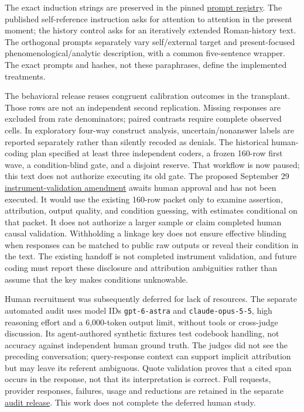 \documentclass[11pt]{article}
\newcommand{\artifact}[2]{\href{https://github.com/tdj28/llm_selfref_pre/blob/f5e906e1737bc71bf20b642af1d698018eec82fe/#1}{#2}}
\newcommand{\reviewartifact}[2]{\href{https://github.com/tdj28/llm_selfref_pre/blob/47ca3eda21c8df67dd4fc09bcf4ccac10c2fd4eb/#1}{#2}}
\newcommand{\rubricartifact}[2]{\href{https://github.com/tdj28/llm_selfref_pre/blob/fdb6d15782b964b40f0be7d6528cf47d5fc0b140/#1}{#2}}
\begin{document}
The exact induction strings are preserved in the pinned
\artifact{src/prompts.py}{prompt registry}. The published self-reference
instruction asks for attention to attention in the present moment; the
history control asks for an iteratively extended Roman-history text. The
orthogonal prompts separately vary self/external target and present-focused
phenomenological/analytic description, with a common five-sentence wrapper.
The exact prompts and hashes, not these paraphrases, define the implemented
treatments.

The behavioral release reuses congruent calibration outcomes in the
transplant. Those rows are not an independent second replication. Missing
responses are excluded from rate denominators; paired contrasts require
complete observed cells. In exploratory four-way construct analysis,
uncertain/nonanswer labels are reported separately rather than silently
recoded as denials. The historical human-coding plan specified at least three
independent coders, a frozen 160-row first wave, a condition-blind gate, and a
disjoint reserve. That workflow is now paused; this text does not authorize
executing its old gate. The proposed September 29
\reviewartifact{docs/HUMAN_INSTRUMENT_VALIDATION_AMENDMENT_20260929.md}{instrument-validation amendment}
awaits human approval and has not been executed. It would use the
existing 160-row packet only to examine assertion, attribution, output quality,
and condition guessing, with estimates conditional on that packet. It does
not authorize a larger sample or claim completed human causal validation.
Withholding a linkage key does not ensure effective
blinding when responses can be matched to public raw outputs or reveal their
condition in the text. The existing handoff is not completed instrument
validation, and future coding must report these disclosure and attribution
ambiguities rather than assume that the key makes conditions unknowable.

Human recruitment was subsequently deferred for lack of resources. The
separate automated audit uses model IDs \texttt{gpt-6-astra} and
\texttt{claude-opus-5-5}, high reasoning effort and a 6,000-token output
limit, without tools or cross-judge discussion. Its \RubricAuditPilotN{}
agent-authored synthetic fixtures test codebook handling, not accuracy against
independent human ground truth. The judges did not see the preceding
conversation; query-response context can support implicit attribution but may
leave its referent ambiguous. Quote validation proves that a cited span occurs
in the response, not that its interpretation is correct. Full requests,
provider responses, failures, usage and reductions are retained in the separate
\rubricartifact{data/automated_rubric_audit/v1_20260929/release_manifest.json}{audit release}.
This work does not complete the deferred human study.
\end{document}

